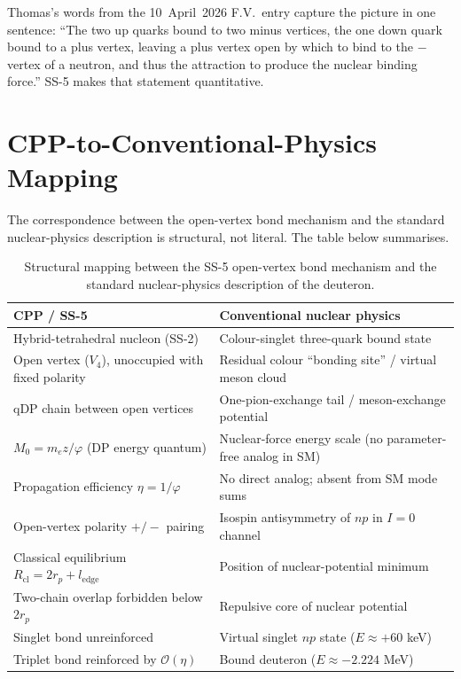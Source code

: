 \documentclass[11pt,letterpaper]{article}
\newcommand{\phig}{\varphi}
\newcommand{\Mzero}{M_0}
\newcommand{\ledge}{l_{\mathrm{edge}}}
\newcommand{\rp}{r_{p}}
\begin{document}
Thomas's words from the 10~April~2026 F.V.\ entry capture the picture in one sentence: ``The two up quarks bound to two minus vertices, the one down quark bound to a plus vertex, leaving a plus vertex open by which to bind to the $-$ vertex of a neutron, and thus the attraction to produce the nuclear binding force.'' SS-5 makes that statement quantitative.

\section{CPP-to-Conventional-Physics Mapping}
\label{sec:mapping}

The correspondence between the open-vertex bond mechanism and the standard nuclear-physics description is structural, not literal. The table below summarises.

\begin{table}[H]
\centering
\caption{Structural mapping between the SS-5 open-vertex bond mechanism and the standard nuclear-physics description of the deuteron.}
\label{tab:mapping}
\begin{tabular}{@{}p{} p{}@{}}
\toprule
\textbf{CPP / SS-5} & \textbf{Conventional nuclear physics} \\
\midrule
Hybrid-tetrahedral nucleon (SS-2) & Colour-singlet three-quark bound state \\[4pt]
Open vertex ($V_4$), unoccupied with fixed polarity & Residual colour ``bonding site'' / virtual meson cloud \\[4pt]
qDP chain between open vertices & One-pion-exchange tail / meson-exchange potential \\[4pt]
$\Mzero = m_e z/\phig$ (DP energy quantum) & Nuclear-force energy scale (no parameter-free analog in SM) \\[4pt]
Propagation efficiency $\eta = 1/\phig$ & No direct analog; absent from SM mode sums \\[4pt]
Open-vertex polarity $+/-$ pairing & Isospin antisymmetry of $np$ in $I=0$ channel \\[4pt]
Classical equilibrium $R_{\mathrm{cl}} = 2\rp + \ledge$ & Position of nuclear-potential minimum \\[4pt]
Two-chain overlap forbidden below $2\rp$ & Repulsive core of nuclear potential \\[4pt]
Singlet bond unreinforced & Virtual singlet $np$ state ($E \approx +60$ keV) \\[4pt]
Triplet bond reinforced by $\mathcal{O}(\eta)$ & Bound deuteron ($E \approx -2.224$ MeV) \\
\bottomrule
\end{tabular}
\end{table}
\end{document}

